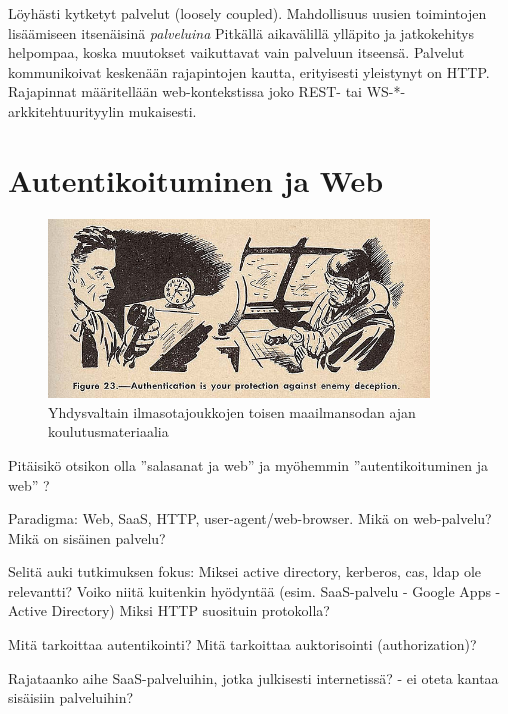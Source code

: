 \documentclass[finnish,gradu]{tktltiki}
\begin{document}
  Löyhästi kytketyt palvelut (loosely coupled).
  Mahdollisuus uusien toimintojen lisäämiseen itsenäisinä \emph{palveluina}
  Pitkällä aikavälillä ylläpito ja jatkokehitys helpompaa, koska muutokset vaikuttavat vain palveluun itseensä.
  Palvelut kommunikoivat keskenään rajapintojen kautta, erityisesti yleistynyt on HTTP.
  Rajapinnat määritellään web-kontekstissa joko REST- tai WS-*-arkkitehtuurityylin mukaisesti.




\section{Autentikoituminen ja Web} %
\label{sec:autentikoituminen_ja_web}

  \begin{figure}
    \centering
    \includegraphics[width=0.9\textwidth]{images/usnavy_authentication.jpg}
    \caption{Yhdysvaltain ilmasotajoukkojen toisen maailmansodan ajan koulutusmateriaalia~\cite{usnavy_authentication}}
    \label{fig:yleiskuva}
  \end{figure}


  Pitäisikö otsikon olla ''salasanat ja web'' ja myöhemmin ''autentikoituminen ja web'' ?

  Paradigma: Web, SaaS, HTTP, user-agent/web-browser.
  Mikä on web-palvelu?
  Mikä on sisäinen palvelu?

  Selitä auki tutkimuksen fokus:
  Miksei active directory, kerberos, cas, ldap ole relevantti?
  Voiko niitä kuitenkin hyödyntää (esim. SaaS-palvelu - Google Apps - Active Directory)
  Miksi HTTP suosituin protokolla?

  Mitä tarkoittaa autentikointi?
  Mitä tarkoittaa auktorisointi (authorization)?

  Rajataanko aihe SaaS-palveluihin, jotka julkisesti internetissä?
  - ei oteta kantaa sisäisiin palveluihin?
\end{document}
